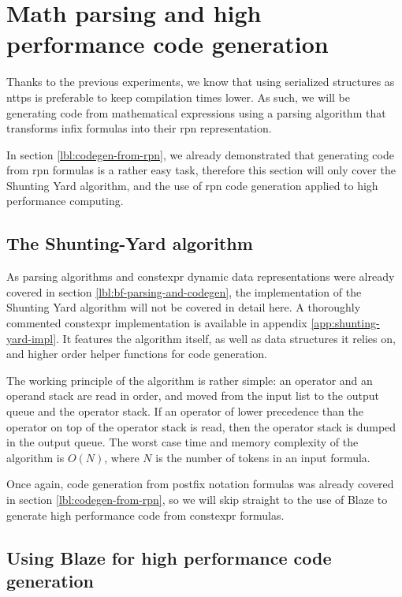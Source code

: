 \documentclass[../main]{subfiles}
\begin{document}

\section{
  Math parsing and high performance code generation
}

Thanks to the previous experiments, we know that using serialized structures
as \glspl{nttp} is preferable to keep compilation times lower.
As such, we will be generating code from mathematical expressions using
a parsing algorithm that transforms infix formulas into their \gls{rpn}
representation.

In section \ref{lbl:codegen-from-rpn}, we already demonstrated that generating code
from \gls{rpn} formulas is a rather easy task, therefore this section
will only cover the Shunting Yard algorithm, and the use of \gls{rpn}
code generation applied to high performance computing.

\subsection{
  The Shunting-Yard algorithm
}

As parsing algorithms and \gls{constexpr} dynamic data representations were
already covered in section \ref{lbl:bf-parsing-and-codegen}, the implementation of
the Shunting Yard algorithm will not be covered in detail here.
A thoroughly commented \gls{constexpr} implementation is available in appendix
\ref{app:shunting-yard-impl}. It features the algorithm itself, as well as
data structures it relies on, and higher order helper functions
for code generation.

The working principle of the algorithm is rather simple:
an operator and an operand stack are read in order, and moved
from the input list to the output queue and the operator stack.
If an operator of lower precedence than the operator on top of the
operator stack is read, then the operator stack is dumped in the output queue.
The worst case time and memory complexity of the algorithm is $O(N)$, where $N$
is the number of tokens in an input formula.

Once again, code generation from postfix notation formulas was already covered
in section \ref{lbl:codegen-from-rpn}, so we will skip straight to the use of Blaze
to generate high performance code from \gls{constexpr} formulas.

\subsection{
  Using Blaze for high performance code generation
}
\end{document}
